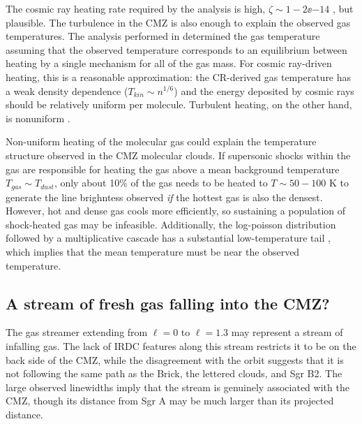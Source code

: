 The cosmic ray heating rate required by the \citet{Ao2013a} analysis is high,
$\zeta\sim1-2\ee{-14}$ \pers, but plausible.  The turbulence in the CMZ is also
enough to explain the observed gas temperatures. 
The analysis performed in \citet{Ao2013a} determined the gas temperature
assuming that the observed temperature corresponds to an equilibrium between
heating by a single mechanism for all of the gas mass.  For cosmic ray-driven
heating, this is a reasonable approximation: the CR-derived gas temperature
has a weak density dependence ($T_{kin}\sim n^{1/6}$) and the energy deposited
by cosmic rays should be relatively uniform per molecule.  Turbulent heating,
on the other hand, is nonuniform \citep{Pan2009a}.

Non-uniform heating of the molecular gas could explain the temperature
structure observed in the CMZ molecular clouds.  If supersonic shocks within
the gas are responsible for heating the gas above a mean background temperature
$T_{gas} \sim T_{dust}$, only about 10\% of the gas needs to be heated to
$T\sim50-100$ K to generate the line brighntess observed \emph{if} the hottest
gas is also the densest.  However, hot and dense gas cools more efficiently, so
sustaining a population of shock-heated gas may be infeasible.  Additionally,
the log-poisson distribution followed by a multiplicative cascade has a substantial
low-temperature tail \citep{Pan2009a}, which implies that the mean temperature
must be near the observed temperature.  


\subsection{A stream of fresh gas falling into the CMZ?}
\label{sec:coolstream}
The gas streamer extending from $\ell=0$ to $\ell=1.3$ may represent a stream
of infalling gas.  The lack of IRDC features along this stream restricts it to
be on the back side of the CMZ, while the disagreement with the
\citet{Kruijssen2014d} orbit suggests that it is not following the same path as
the Brick, the lettered clouds, and Sgr B2.  The large observed linewidths
imply that the stream is genuinely associated with the CMZ, though its distance
from Sgr A may be much larger than its projected distance.

